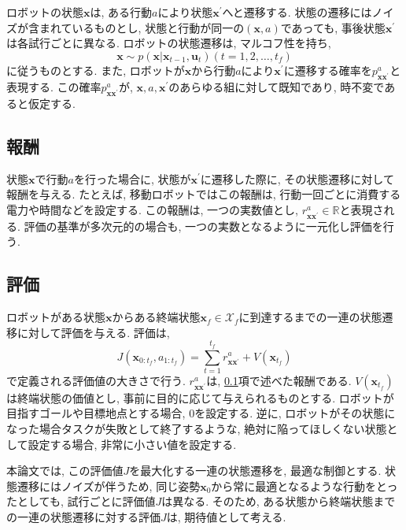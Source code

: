 ロボットの状態$\bm{x}$は, ある行動$a$により状態$\bm{x}^{\prime}$へと遷移する. 
状態の遷移にはノイズが含まれているものとし, 状態と行動が同一の$(\bm{x}, a)$であっても, 事後状態$\bm{x}^{\prime}$は各試行ごとに異なる. 
ロボットの状態遷移は, マルコフ性を持ち, 
\begin{equation}
\label{trans prob}
  \bm{x} \sim p(\bm{x} | \bm{x}_{t-1}, \bm{u}_t) (t=1,2,\ldots,t_{f})
\end{equation}
に従うものとする. 
また, ロボットが$\bm{x}$から行動$a$により$\bm{x}^{\prime}$に遷移する確率を$p^{a}_{\bm{x}\bm{x}^{\prime}}$と表現する. 
この確率$p^{a}_{\bm{x}\bm{x}^{\prime}}$が, $\bm{x}, a, \bm{x}^{\prime}$のあらゆる組に対して既知であり, 時不変であると仮定する. 

\subsection{報酬} \label{subsection:reward}
状態$\bm{x}$で行動$a$を行った場合に, 状態が$\bm{x}^{\prime}$に遷移した際に, その状態遷移に対して報酬を与える. 
たとえば, 移動ロボットではこの報酬は, 行動一回ごとに消費する電力や時間などを設定する. 
この報酬は, 一つの実数値とし, $r^{a}_{\bm{x}\bm{x}^{\prime}} \in \mathbb{R}$と表現される. 
評価の基準が多次元的の場合も, 一つの実数となるように一元化し評価を行う. 

\subsection{評価}
ロボットがある状態$\bm{x}$からある終端状態$\bm{x}_{f} \in \mathcal{X}_{f}$に到達するまでの一連の状態遷移に対して評価を与える. 
評価は, 
\begin{equation}
\label{evaluation}
  J( \bm{x}_{0:t_{f}}, a_{1:t_{f}} ) = \sum^{t_{f}}_{t=1} r^{a}_{\bm{x}\bm{x}^{\prime}} + V(\bm{x}_{t_{f}})
\end{equation}
で定義される評価値の大きさで行う. 
$r^{a}_{\bm{x}\bm{x}^{\prime}}$は, \ref{subsection:reward}項で述べた報酬である. 
$V(\bm{x}_{t_{f}})$は終端状態の価値とし, 事前に目的に応じて与えられるものとする. 
ロボットが目指すゴールや目標地点とする場合, $0$を設定する. 
逆に, ロボットがその状態になった場合タスクが失敗として終了するような, 絶対に陥ってほしくない状態として設定する場合, 非常に小さい値を設定する. 

本論文では, この評価値$J$を最大化する一連の状態遷移を, 最適な制御とする. 
状態遷移にはノイズが伴うため, 同じ姿勢$\bm{x}_{0}$から常に最適となるような行動をとったとしても, 試行ごとに評価値$J$は異なる. 
そのため, ある状態から終端状態までの一連の状態遷移に対する評価$J$は, 期待値として考える. 


